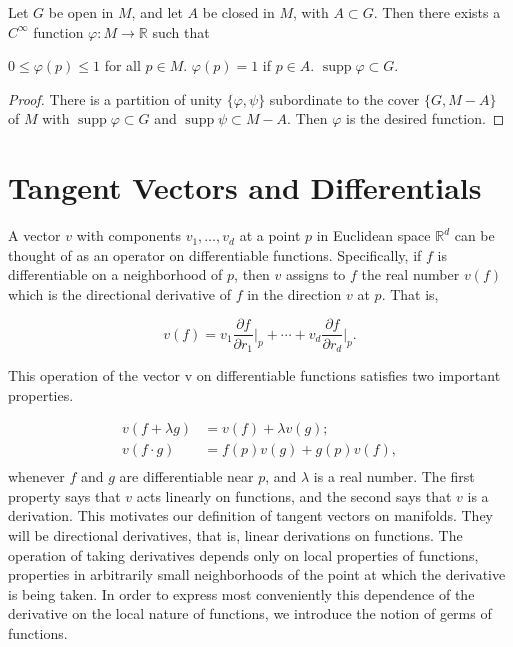 \begin{corollary*}
	Let $G$ be open in $M$, and let $A$ be closed in $M$, with $A \subset G$. Then there exists a $C^{\infty}$ function $\varphi: M \to \mathbb{R}$ such that
	\begin{enumerate}
		  $ 0 \leq \varphi(p) \leq 1 $ for all  $ p \in M $.
		  $ \varphi(p) = 1 $ if  $ p \in A $.
		 $\operatorname{supp}\varphi \subset G$.
	\end{enumerate}
\end{corollary*}

\begin{proof}
	There is a partition of unity $\{\varphi, \psi\}$ subordinate to the cover
	$\{G, M - A\}$ of $M$ with $\operatorname{supp} \varphi \subset G$ and
	$\operatorname{supp} \psi \subset M - A$. Then $\varphi$ is the desired function.
\end{proof}

\section{Tangent Vectors and Differentials}

\label{thm:1.12}
A vector $v$ with components $v_{1}, \ldots, v_{d}$ at a
point $p$ in Euclidean space $\mathbb{R}^{d}$ can be
thought of as an operator on differentiable functions.
Specifically, if $f$ is differentiable on a neighborhood of $p$,
then $v$ assigns to $f$ the real number $v(f)$ which is the
directional derivative of $f$ in the direction $v$ at $p$. That is,

\begin{equation}
	\label{eq:1.12:1}
	v(f)=v_{1}\frac{\partial f}{\partial r_{1}}\bigg|_{p}+\cdots+v_{d}\frac{\partial f}{\partial r_{d}}\bigg|_{p}.
\end{equation}

This operation of the vector v on differentiable functions satisfies two important properties.

\begin{equation}
	\label{eq:1.12:2}%
	\begin{aligned}{v(f+\lambda g)}&{{}=v(f)+\lambda v(g);}\\ {v(f\cdot g)}&{{}=f(p)v(g)+g(p)v(f),}\\ \end{aligned}
\end{equation}
whenever $f$ and $g$ are differentiable near $p$, and $\lambda$ is a real number.
The first property says that $v$ acts linearly on functions,
and the second says that $v$ is a derivation. This motivates our
definition of tangent vectors on manifolds. They will be directional derivatives,
that is, linear derivations on functions. The operation of taking derivatives
depends only on local properties of functions, properties in arbitrarily small
neighborhoods of the point at which the derivative is being taken. In order
to express most conveniently this dependence of the derivative on the
local nature of functions, we introduce the notion of germs of functions.

